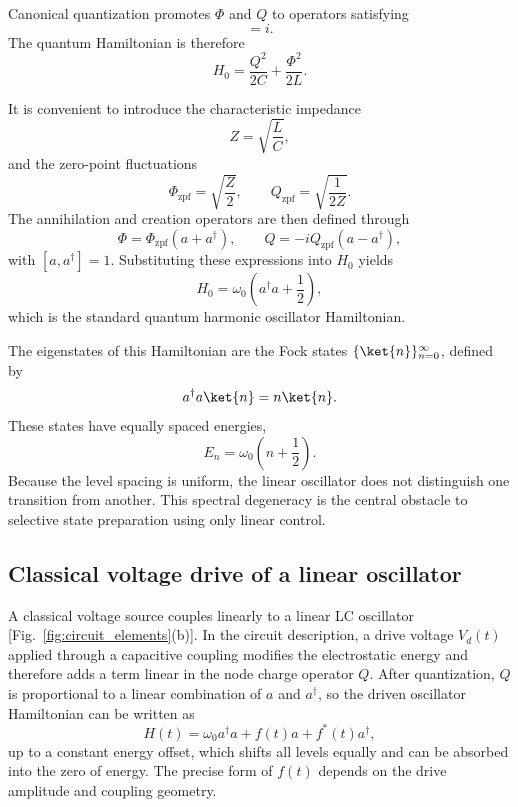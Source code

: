 Canonical quantization promotes $\Phi$ and $Q$ to operators satisfying
\begin{equation}
    [\Phi,Q] = i.
\end{equation}
The quantum Hamiltonian is therefore
\begin{equation}
    H_{0} = \frac{Q^{2}}{2C} + \frac{\Phi^{2}}{2L}.
\end{equation}

It is convenient to introduce the characteristic impedance
\begin{equation}
    Z = \sqrt{\frac{L}{C}},
\end{equation}
and the zero-point fluctuations
\begin{equation}
    \Phi_{\mathrm{zpf}} = \sqrt{\frac{Z}{2}},
    \qquad
    Q_{\mathrm{zpf}} = \sqrt{\frac{1}{2Z}}.
\end{equation}
The annihilation and creation operators are then defined through
\begin{equation}
    \Phi = \Phi_{\mathrm{zpf}}(a+a^{\dagger}),
    \qquad
    Q = -iQ_{\mathrm{zpf}}(a-a^{\dagger}),
\end{equation}
with $[a,a^{\dagger}] = 1$. Substituting these expressions into $H_{0}$ yields
\begin{equation}
    H_{0}
    =
    \omega_{0}\left(a^{\dagger}a+\frac{1}{2}\right),
\end{equation}
which is the standard quantum harmonic oscillator Hamiltonian.

The eigenstates of this Hamiltonian are the Fock states $\{\ket{n}\}_{n=0}^{\infty}$, defined by
\begin{equation}
    a^{\dagger}a\ket{n} = n\ket{n}.
\end{equation}
These states have equally spaced energies,
\begin{equation}
    E_{n} = \omega_{0}\left(n+\frac{1}{2}\right).
\end{equation}
Because the level spacing is uniform, the linear oscillator does not distinguish one transition from another. This spectral degeneracy is the central obstacle to selective state preparation using only linear control.

\subsection{Classical voltage drive of a linear oscillator}

A classical voltage source couples linearly to a linear LC oscillator [Fig.~\ref{fig:circuit_elements}(b)]. In the circuit description, a drive voltage $V_d(t)$ applied through a capacitive coupling modifies the electrostatic energy and therefore adds a term linear in the node charge operator $Q$. After quantization, $Q$ is proportional to a linear combination of $a$ and $a^\dagger$, so the driven oscillator Hamiltonian can be written as
\begin{equation}
    H(t)
    =
    \omega_0 a^\dagger a
    +
    f(t)a
    +
    f^*(t)a^\dagger,
\end{equation}
up to a constant energy offset, which shifts all levels equally and can be absorbed into the zero of energy. The precise form of $f(t)$ depends on the drive amplitude and coupling geometry.

